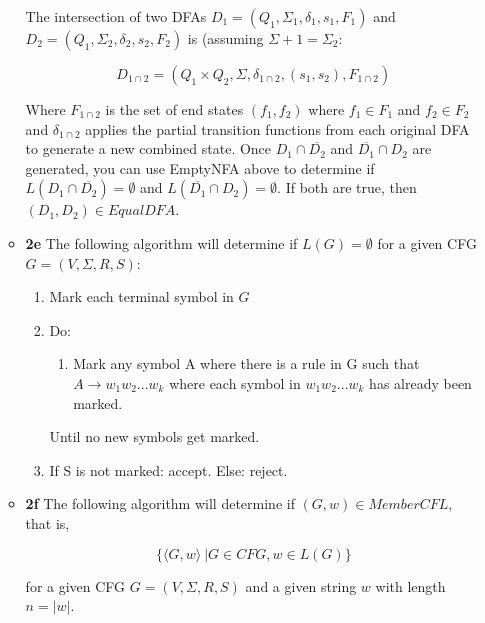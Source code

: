 \documentclass[12pt]{article}
\begin{document}
\begin{enumerate}
\begin{itemize}
The intersection of two DFAs $D_1 = (Q_1, \Sigma_1, \delta_1, s_1, F_1)$ and $D_2 = (Q_1, \Sigma_2, \delta_2, s_2, F_2)$ is (assuming $\Sigma+1 = \Sigma_2: $

\begin{equation*}
D_{1\cap 2} = (Q_1 \times Q_2, \Sigma, \delta_{1\cap 2}, (s_1,s_2), F_{1\cap 2})
\end{equation*}

Where $F_{1\cap 2}$ is the set of end states $(f_1,f_2)$ where $f_1 \in F_1$ and $f_2 \in F_2$ and $\delta_{1\cap2}$ applies the partial transition functions from each original DFA to generate a new combined state. Once $D_1 \cap \overline{D_2}$ and $\overline{D_1} \cap D_2$ are generated, you can use EmptyNFA above to determine if $L(D_1 \cap \overline{D_2}) = \emptyset$ and $L(\overline{D_1} \cap D_2) = \emptyset$. If both are true, then $(D_1,D_2) \in EqualDFA$.

\item \textbf{2e} The following algorithm will determine if $L(G) = \emptyset$ for a given CFG $G = (V,\Sigma, R, S)$:


\begin{enumerate}
\item Mark each terminal symbol in $G$ 
\item Do: 
\begin{enumerate}
\item Mark any symbol A where there is a rule in G such that $A \rightarrow w_1w_2...w_k$ where each symbol in $w_1w_2...w_k$ has already been marked.
\end{enumerate}
 Until no new symbols get marked.
\item If S is not marked: accept. Else: reject.
\end{enumerate}

\item \textbf{2f} The following algorithm will determine if $(G,w) \in MemberCFL$, that is,

\begin{equation}
\{\langle G,w\rangle\ | G \in CFG, w \in L(G)\}
\end{equation}

for a given CFG $G = (V, \Sigma, R, S)$ and a given string $w$ with length $n = |w|$. 


\end{itemize}
\end{enumerate}
\end{document}
